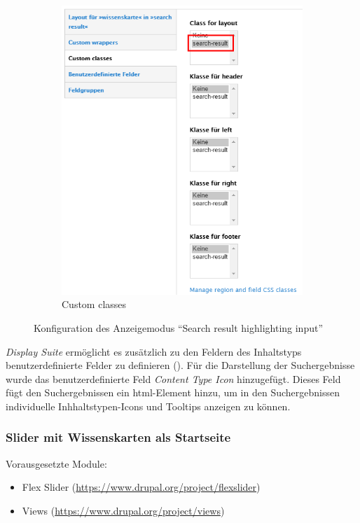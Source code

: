 \begin{figure}[H]
\begin{subfigure}[b]{0.30\textwidth}
		\includegraphics[width=\linewidth]{images/config_searchresult_viewmodesearchclass}
		\caption[]{Custom classes}
		\label{fig:config_searchresult_viewmodesearchclass}
	\end{subfigure}
	\caption{Konfiguration des Anzeigemodus \enquote{Search result highlighting input}}
	\label{fig:config_searchresult}
\end{figure}


\textit{Display Suite} ermöglicht es zusätzlich zu den Feldern des Inhaltstyps benutzerdefinierte Felder zu definieren (). Für die Darstellung der Suchergebnisse wurde \zB das benutzerdefinierte Feld \textit{Content Type Icon} hinzugefügt. Dieses Feld fügt den Suchergebnissen ein html-Element hinzu, um in den Suchergebnissen individuelle Inhhaltstypen-Icons und Tooltips anzeigen zu können. 




\newpage
\subsubsection{Slider mit Wissenskarten als Startseite}\label{subsub:wkslider}
Vorausgesetzte Module:
\begin{itemize}
	\item Flex Slider (\url{https://www.drupal.org/project/flexslider})
	\item Views (\url{https://www.drupal.org/project/views})
\end{itemize}


